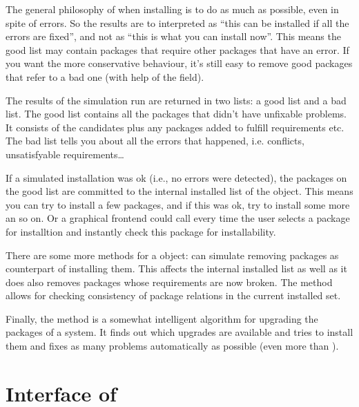 \documentclass[10pt]{article}
\begin{document}
The general philosophy of  when installing is to do as
much as possible, even in spite of errors. So the results are to
interpreted as ``this can be installed if all the errors are fixed'',
and not as ``this is what you can install now''. This means the good
list may contain packages that require other packages that have an
error. If you want the more conservative behaviour, it's still easy to
remove good packages that refer to a bad one (with help of the
 field).

The results of the simulation run are returned in two lists: a good
list and a bad list. The good list contains all the packages that
didn't have unfixable problems. It consists of the candidates plus any
packages added to fulfill requirements etc. The bad list tells you
about all the errors that happened, i.e. conflicts, unsatisfyable
requirements\dots

If a simulated installation was ok (i.e., no errors were detected),
the packages on the good list are committed to the internal installed
list of the  object. This means you can try to install a
few packages, and if this was ok, try to install some more an so on.
Or a graphical frontend could call  every time the user
selects a package for installtion and instantly check this package for
installability.

There are some more methods for a  object: 
can simulate removing packages as counterpart of installing them. This
affects the internal installed list as well as it does also removes
packages whose requirements are now broken. The 
method allows for checking consistency of package relations in the
current installed set.

Finally, the  method is a somewhat intelligent algorithm
for upgrading the packages of a system. It finds out which upgrades
are available and tries to install them and fixes as many problems
automatically as possible (even more than ).



\section{Interface of }

\end{document}
